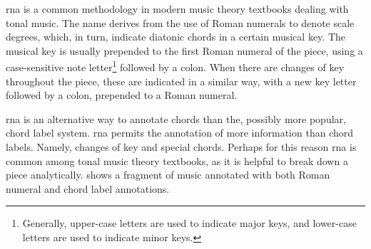 

\gls{rna} is a common methodology in modern music theory
textbooks dealing with tonal music. The name derives from
the use of Roman numerals to denote scale degrees, which, in
turn, indicate diatonic chords in a certain musical key. The
musical key is usually prepended to the first Roman numeral
of the piece, using a case-sensitive note
letter\footnote{Generally, upper-case letters are used to
indicate major keys, and lower-case letters are used to
indicate minor keys.} followed by a colon. When there are
changes of key throughout the piece, these are indicated in
a similar way, with a new key letter followed by a colon,
prepended to a Roman numeral.

\gls{rna} is an alternative way to annotate chords than the,
possibly more popular, chord label system. \gls{rna} permits
the annotation of more information than chord labels.
Namely, changes of key and special chords. Perhaps for this
reason \gls{rna} is common among tonal music theory
textbooks, as it is helpful to break down a piece
analytically.  shows a fragment of music
annotated with both Roman numeral and chord label
annotations.


